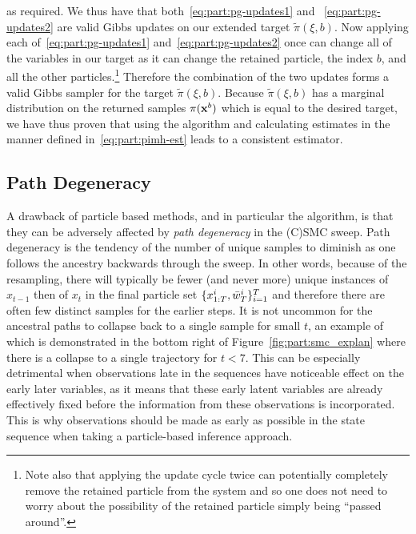 as required.  We thus have that both~\eqref{eq:part:pg-updates1} and ~\eqref{eq:part:pg-updates2} are valid
Gibbs updates on our extended target $\tilde{\pi}(\xi,b)$.  Now applying each 
of~\eqref{eq:part:pg-updates1} and~\eqref{eq:part:pg-updates2} once can change all of the variables in
our target as it can change the retained particle, the index $b$, and all the other particles.\footnote{Note
	also that applying the update cycle twice can potentially completely remove the retained particle from the
	system and so one does not need to worry about the possibility of the retained particle simply being ``passed around''.}
Therefore the combination of the two updates forms a valid Gibbs sampler for the target $\tilde{\pi}(\xi,b)$.
Because $\tilde{\pi}(\xi,b)$ has a marginal distribution on the returned samples $\pi (\mathbf{x}^b)$ which is equal to
the desired target, we have thus proven that using the \pg algorithm and calculating estimates in the manner 
defined in~\eqref{eq:part:pimh-est} leads to a consistent estimator.

\subsection{Path Degeneracy}
\label{sec:part:pmcmc:path-deg}

A drawback of particle based methods, and in particular the \pg algorithm, is that they can be adversely 
affected by \emph{path degeneracy} in the (C)SMC sweep.  Path degeneracy is the tendency of the number
of unique samples to diminish as one follows the ancestry backwards through the sweep.  In other words, because
of the resampling, there will typically be fewer (and never more) unique instances of $x_{t-1}$ then of $x_t$
in the final particle set $\{x_{1:T}^i,\bar w_{T}^i\}_{i=1}^T$ and therefore there are often few distinct samples
for the earlier steps.  It is not uncommon for the ancestral paths to collapse back to a single sample for
small $t$, an example of which is demonstrated in the bottom right of Figure~\ref{fig:part:smc_explan}
where there is a collapse to a single trajectory for $t<7$.
This can be especially detrimental when observations late in the sequences have noticeable
effect on the early later variables, as it means that these early latent variables are already effectively
fixed before the information from these observations is incorporated.   This is why observations should
be made as early as possible in the state sequence when taking a particle-based inference approach.

